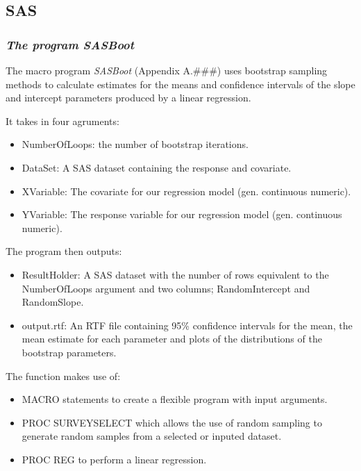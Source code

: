 \documentclass[]{article}
\providecommand{\tightlist}{%
  \setlength{\itemsep}{0pt}\setlength{\parskip}{0pt}}
\begin{document}
\pagebreak 

\subsection{SAS}\label{sas}

\subsubsection{\texorpdfstring{\emph{The program
SASBoot}}{The program SASBoot}}\label{the-program-sasboot}

The macro program \emph{SASBoot} (Appendix A.\#\#\#) uses bootstrap
sampling methods to calculate estimates for the means and confidence
intervals of the slope and intercept parameters produced by a linear
regression.

It takes in four agruments:

\begin{itemize}
\tightlist
\item
  NumberOfLoops: the number of bootstrap iterations.
\item
  DataSet: A SAS dataset containing the response and covariate.
\item
  XVariable: The covariate for our regression model (gen. continuous
  numeric).
\item
  YVariable: The response variable for our regression model (gen.
  continuous numeric).
\end{itemize}

The program then outputs:

\begin{itemize}
\tightlist
\item
  ResultHolder: A SAS dataset with the number of rows equivalent to the
  NumberOfLoops argument and two columns; RandomIntercept and
  RandomSlope.
\item
  output.rtf: An RTF file containing 95\% confidence intervals for the
  mean, the mean estimate for each parameter and plots of the
  distributions of the bootstrap parameters.
\end{itemize}

The function makes use of:

\begin{itemize}
\tightlist
\item
  MACRO statements to create a flexible program with input arguments.
\item
  PROC SURVEYSELECT which allows the use of random sampling to generate
  random samples from a selected or inputed dataset.
\item
  PROC REG to perform a linear regression.
\end{itemize}
\end{document}
